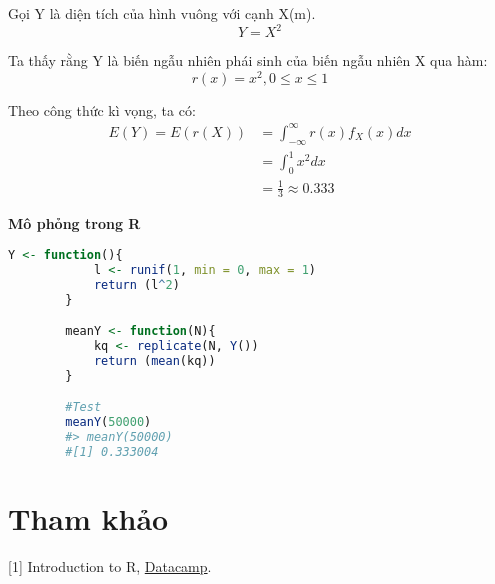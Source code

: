 \documentclass[a4paper,12pt]{article}
\begin{document}
	Gọi Y là diện tích của hình vuông với cạnh X(m).
	$$Y = X^2$$
		
	Ta thấy rằng Y là biến ngẫu nhiên phái sinh của biến ngẫu nhiên X qua hàm:
	$$r(x) = x^2, 0 \leq x \leq 1$$
	
	Theo công thức kì vọng, ta có:
	\begin{align*}
		E(Y) = E(r(X)) &= \int_{-\infty}^{\infty} r(x)f_X(x)dx \\
		&= \int_0^1 x^2dx \\
		&= \frac{1}{3} \approx 0.333
	\end{align*}	
	
	
	{\large\textbf{Mô phỏng trong R}} \\
	\begin{lstlisting}[language=R]
		Y <- function(){
			l <- runif(1, min = 0, max = 1)
			return (l^2)
		}

		meanY <- function(N){
			kq <- replicate(N, Y())
			return (mean(kq))
		}

		#Test
		meanY(50000)
		#> meanY(50000)
		#[1] 0.333004
	\end{lstlisting}
	
	\section{Tham khảo}
	\label{Tham khao}
	[1] Introduction to R, \href{https://campus.datacamp.com/courses/free-introduction-to-r}{Datacamp}. \\
	
\end{document}
